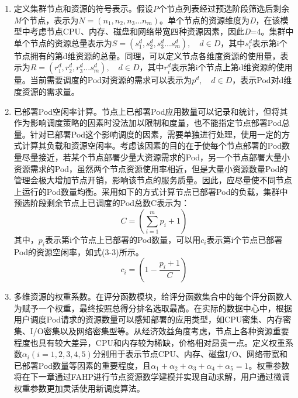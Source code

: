 \begin{enumerate}[(1)]
	\item 定义集群节点和资源的符号表示。假设\emph{P}个节点列表经过预选阶段筛选后剩余\emph{M}个节点，表示为\begin{math}N=(n_{1}, n_{2}, n_{3}...n_{m})\end{math}。单个节点的资源维度为\emph{D}，在该模型中考虑节点CPU、内存、磁盘和网络带宽四种资源因素，因此\emph{D}=4。集群中单个节点的资源总量表示为\begin{math}S=(s^{d}_{1}, s^{d}_{2}, s^{d}_{3}...s^{d}_{m}),\quad d\in{D}\end{math}，其中\begin{math}s^{d}_{i}\end{math}表示第i个节点拥有的第d维资源的总量。同理，可以定义节点各维度资源的使用量，表示为\begin{math}R=(r^{d}_{1}, r^{d}_{2}, r^{d}_{3}...s^{d}_{m}),\quad d\in{D}\end{math}，其中\begin{math}r^{d}_{i}\end{math}表示第i个节点上第d维资源的使用量。当前需要调度的Pod对资源的需求可以表示为\begin{math}p^{d},\quad d\in{D}\end{math}，表示Pod对d维度资源的需求量。
	\item 已部署Pod空闲率计算。节点上已部署Pod应用数量可以记录和统计，但将其作为影响调度策略的因素时没法加以限制和度量，也不能指定节点部署Pod总量。针对已部署Pod这个影响调度的因素，需要单独进行处理，使用一定的方式计算其负载和资源空闲率。考虑该因素的目的在于使每个节点部署的Pod数量尽量接近，若某个节点部署少量大资源需求的Pod，另一个节点部署大量小资源需求的Pod，虽然两个节点资源使用率相近，但是大量小资源数量Pod的管理会极大增加节点开销，影响该节点的服务质量。因此，应尽量使不同节点上运行的Pod数量均衡。采用如下的方式计算节点已部署Pod的负载，集群中预选阶段剩余节点上已调度的Pod总数C表示为：
	\begin{equation}
	C = (\sum_{i=1}^{m}p_{i} + 1)
	\end{equation}
	其中，\begin{math}p_{i}\end{math}表示第i个节点上已部署的Pod数量，可以用$c_{i}$表示第i个节点已部署Pod的资源空闲率，如式(3-3)所示。
	\begin{equation}
	c_{i} = (1-\frac{p_{i}+1}{C})
	\end{equation}
	\item 多维资源的权重系数。在评分函数模块，给评分函数集合中的每个评分函数人为赋予一个权重，最终按照总得分排名选取最高。在实际的数据中心中，根据用户调度Pod请求的资源数量可以感知部署的应用类型，如CPU密集、内存密集、I/O密集以及网络密集型等。从经济效益角度考虑，节点上各种资源重要程度也具有较大差异，CPU和内存较为稀缺，价格相对昂贵一点。定义权重系数\begin{math}\alpha_{i}(i=1, 2, 3, 4, 5)\end{math}分别用于表示节点CPU、内存、磁盘I/O、网络带宽和已部署Pod数量等因素的重要程度，且$\alpha_{1}+\alpha_{2}+\alpha_{3}+\alpha_{4}+\alpha_{5}=1$。权重参数将在下一章通过FAHP进行节点资源数学建模并实现自动求解，用户通过微调权重参数更加灵活使用新调度算法。
\end{enumerate}

